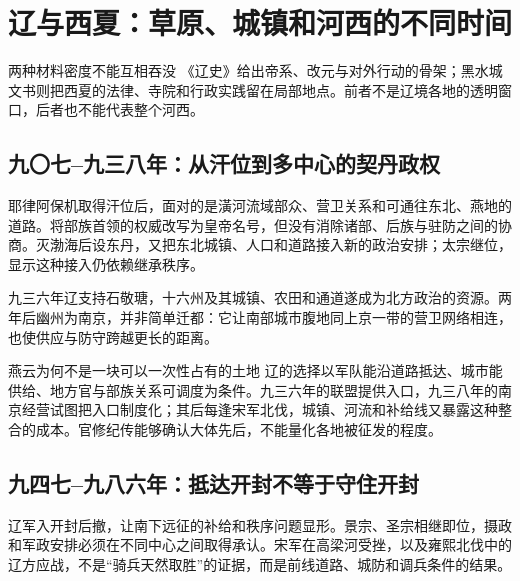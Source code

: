 \section{辽与西夏：草原、城镇和河西的不同时间}

\begin{textwindow}{两种材料密度不能互相吞没}
《辽史》给出帝系、改元与对外行动的骨架；黑水城文书则把西夏的法律、寺院和行政实践留在局部地点。前者不是辽境各地的透明窗口，后者也不能代表整个河西。
\end{textwindow}

\subsection{九〇七--九三八年：从汗位到多中心的契丹政权}
耶律阿保机取得汗位后，面对的是潢河流域部众、营卫关系和可通往东北、燕地的道路。将部族首领的权威改写为皇帝名号，但没有消除诸部、后族与驻防之间的协商。灭渤海后设东丹，又把东北城镇、人口和道路接入新的政治安排；太宗继位，显示这种接入仍依赖继承秩序。

九三六年辽支持石敬瑭，十六州及其城镇、农田和通道遂成为北方政治的资源。两年后幽州为南京，并非简单迁都：它让南部城市腹地同上京一带的营卫网络相连，也使供应与防守跨越更长的距离。

\begin{causalchain}{燕云为何不是一块可以一次性占有的土地}
辽的选择以军队能沿道路抵达、城市能供给、地方官与部族关系可调度为条件。九三六年的联盟提供入口，九三八年的南京经营试图把入口制度化；其后每逢宋军北伐，城镇、河流和补给线又暴露这种整合的成本。官修纪传能够确认大体先后，不能量化各地被征发的程度。
\end{causalchain}

\subsection{九四七--九八六年：抵达开封不等于守住开封}
辽军入开封后撤，让南下远征的补给和秩序问题显形。景宗、圣宗相继即位，摄政和军政安排必须在不同中心之间取得承认。宋军在高梁河受挫，以及雍熙北伐中的辽方应战，不是“骑兵天然取胜”的证据，而是前线道路、城防和调兵条件的结果。

